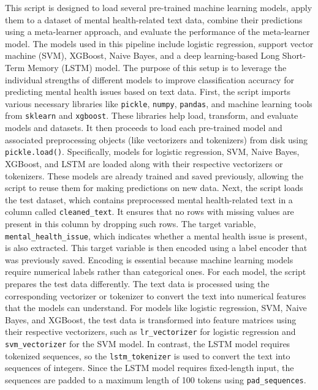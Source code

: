 \noindent
This script is designed to load several pre-trained machine learning models, apply them to a dataset of mental health-related text data, combine their predictions using a meta-learner approach, and evaluate the performance of the meta-learner model. The models used in this pipeline include logistic regression, support vector machine (SVM), XGBoost, Naive Bayes, and a deep learning-based Long Short-Term Memory (LSTM) model. The purpose of this setup is to leverage the individual strengths of different models to improve classification accuracy for predicting mental health issues based on text data. First, the script imports various necessary libraries like \texttt{pickle}, \texttt{numpy}, \texttt{pandas}, and machine learning tools from \texttt{sklearn} and \texttt{xgboost}. These libraries help load, transform, and evaluate models and datasets. It then proceeds to load each pre-trained model and associated preprocessing objects (like vectorizers and tokenizers) from disk using \texttt{pickle.load()}. Specifically, models for logistic regression, SVM, Naive Bayes, XGBoost, and LSTM are loaded along with their respective vectorizers or tokenizers. These models are already trained and saved previously, allowing the script to reuse them for making predictions on new data. Next, the script loads the test dataset, which contains preprocessed mental health-related text in a column called \texttt{cleaned\_text}. It ensures that no rows with missing values are present in this column by dropping such rows. The target variable, \texttt{mental\_health\_issue}, which indicates whether a mental health issue is present, is also extracted. This target variable is then encoded using a label encoder that was previously saved. Encoding is essential because machine learning models require numerical labels rather than categorical ones. For each model, the script prepares the test data differently. The text data is processed using the corresponding vectorizer or tokenizer to convert the text into numerical features that the models can understand. For models like logistic regression, SVM, Naive Bayes, and XGBoost, the test data is transformed into feature matrices using their respective vectorizers, such as \texttt{lr\_vectorizer} for logistic regression and \texttt{svm\_vectorizer} for the SVM model. In contrast, the LSTM model requires tokenized sequences, so the \texttt{lstm\_tokenizer} is used to convert the text into sequences of integers. Since the LSTM model requires fixed-length input, the sequences are padded to a maximum length of 100 tokens using \texttt{pad\_sequences}.
